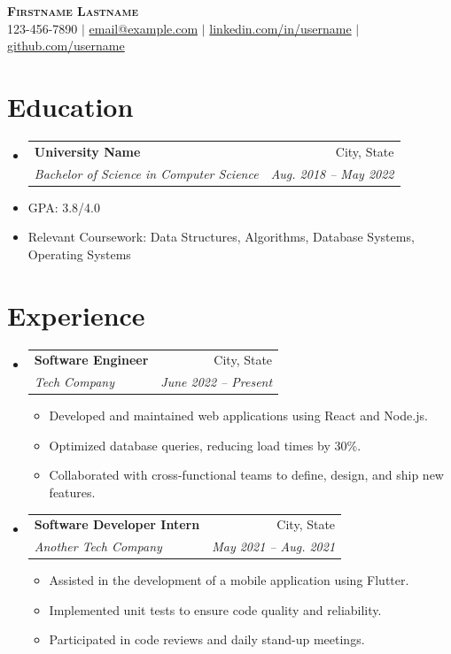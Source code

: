 \documentclass[11pt,a4paper]{article}
\makeatletter
\newcommand{\resumeItem}[1]{
  \item\small{
    {#1 \vspace{-2pt}}
  }
}
\newcommand{\resumeSubheading}[4]{
  \vspace{-1pt}\item
    \begin{tabular*}{0.97\textwidth}[t]{l@{\extracolsep{\fill}}r}
      \textbf{#1} & #2 \\
      \textit{\small#3} & \textit{\small #4} \\
    \end{tabular*}\vspace{-5pt}
}
\makeatother
\begin{document}
\begin{center}
    \textbf{\Huge \scshape Firstname Lastname} \\ \vspace{2pt}
    \small 123-456-7890 $|$ \href{mailto:email@example.com}{email@example.com} $|$ 
    \href{https://linkedin.com/in/username}{linkedin.com/in/username} $|$
    \href{https://github.com/username}{github.com/username}
\end{center}


\section{Education}
  \begin{itemize}[leftmargin=0.15in, label={}]
    \resumeSubheading
      {University Name}{City, State}
      {Bachelor of Science in Computer Science}{Aug. 2018 -- May 2022}
      \resumeItem{GPA: 3.8/4.0}
      \resumeItem{Relevant Coursework: Data Structures, Algorithms, Database Systems, Operating Systems}
  \end{itemize}


\section{Experience}
  \begin{itemize}[leftmargin=0.15in, label={}]

    \resumeSubheading
      {Software Engineer}{City, State}
      {Tech Company}{June 2022 -- Present}
      \begin{itemize}
        \resumeItem{Developed and maintained web applications using React and Node.js.}
        \resumeItem{Optimized database queries, reducing load times by 30\%.}
        \resumeItem{Collaborated with cross-functional teams to define, design, and ship new features.}
      \end{itemize}

    \resumeSubheading
      {Software Developer Intern}{City, State}
      {Another Tech Company}{May 2021 -- Aug. 2021}
      \begin{itemize}
        \resumeItem{Assisted in the development of a mobile application using Flutter.}
        \resumeItem{Implemented unit tests to ensure code quality and reliability.}
        \resumeItem{Participated in code reviews and daily stand-up meetings.}
      \end{itemize}

  \end{itemize}
\end{document}
